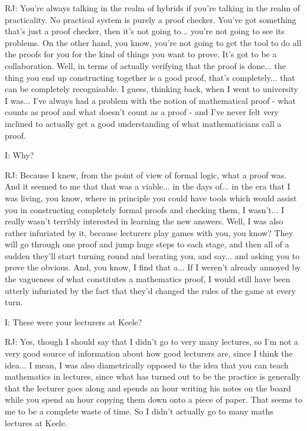 \documentclass[10pt,titlepage]{book}
\begin{document}
RJ: You're always talking in the realm of hybrids if you're talking in the realm of practicality.
No practical system is purely a proof checker.
You've got something that's just a proof checker, then it's not going to... you're not going to see its problems.
On the other hand, you know, you're not going to get the tool to do all the proofs for you for the kind of things you want to prove.
It's got to be a collaboration.
Well, in terms of actually verifying that the proof is done... the thing you end up constructing together is a good proof, that's completely... that can be completely recognisable.
I guess, thinking back, when I went to university I was... I've always had a problem with the notion of mathematical proof - what counts as proof and what doesn't count as a proof - and I've never felt very inclined to actually get a good understanding of what mathematicians call a proof.

I: Why?

RJ: Because I knew, from the point of view of formal logic, what a proof was.
And it seemed to me that that was a viable... in the days of... in the era that I was living, you know, where in principle you could have tools which would assist you in constructing completely formal proofs and checking them, I wasn't... I really wasn't terribly interested in learning the new answers.
Well, I was also rather infuriated by it, because lecturers play games with you, you know? They will go through one proof and jump huge steps to each stage, and then all of a sudden they'll start turning round and berating you, and say... and asking you to prove the obvious. And, you know, I find that a... If I weren't already annoyed by the vagueness of what constitutes a mathematics proof, I would still have been utterly infuriated by the fact that they'd changed the rules of the game at every turn.

I: These were your lecturers at Keele?

RJ: Yes, though I should say that I didn't go to very many lectures, so I'm not a very good source of information about how good lecturers are, since I think the idea... I mean, I was also diametrically opposed to the idea that you can teach mathematics in lectures, since what has turned out to be the practice is generally that the lecturer goes along and spends an hour writing his notes on the board while you spend an hour copying them down onto a piece of paper. That seems to me to be a complete waste of time. So I didn't actually go to many maths lectures at Keele.
\end{document}
